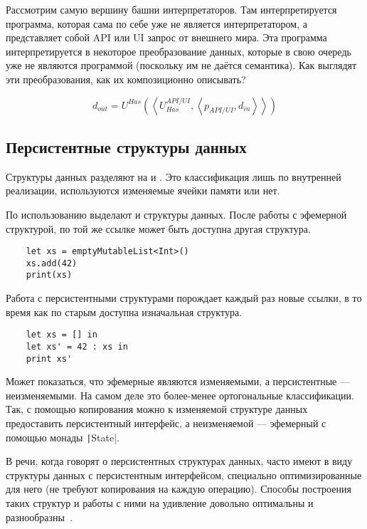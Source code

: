 
Рассмотрим самую вершину башни интерпретаторов.
Там интерпретируется программа, которая сама по себе уже не является интерпретатором, а представляет собой API или UI запрос от внешнего мира.
Эта программа интерпретируется в некоторое преобразование данных, которые в свою очередь уже не являются программой (поскольку им не даётся семантика).
Как выглядят эти преобразования, как их композиционно описывать?

\[
    d_{out} =
    U^{Has}\left(
    \left<
    U_{Has}^{API/UI},
    \left<
    p_{API/UI},
    d_{in}
    \right>
    \right>
    \right)
\]

\subsection{Персистентные структуры данных}

Структуры данных разделяют на  и .
Это классификация лишь по внутренней реализации, используются изменяемые ячейки памяти или нет.

По использованию выделают  и  структуры данных.
После работы с эфемерной структурой, по той же ссылке может быть доступна другая структура.
\begin{verbatim}
    let xs = emptyMutableList<Int>()
    xs.add(42)
    print(xs)
\end{verbatim}

Работа с персистентными структурами порождает каждый раз новые ссылки, в то время как по старым доступна изначальная структура.
\begin{verbatim}
    let xs = [] in
    let xs' = 42 : xs in
    print xs'
\end{verbatim}

Может показаться, что эфемерные являются изменяемыми, а персистентные --- неизменяемыми.
На самом деле это более-менее ортогональные классификации.
Так, с помощью копирования можно к изменяемой структуре данных предоставить персистентный интерфейс, а неизменяемой --- эфемерный с помощью монады \texttt|State|.

В речи, когда говорят о персистентных структурах данных, часто имеют в виду структуры данных с персистентным интерфейсом, специально оптимизированные для него (не требуют копирования на каждую операцию).
Способы построения таких структур и работы с ними на удивление довольно оптимальны и разнообразны~\cite{okasaki1999purely}.

